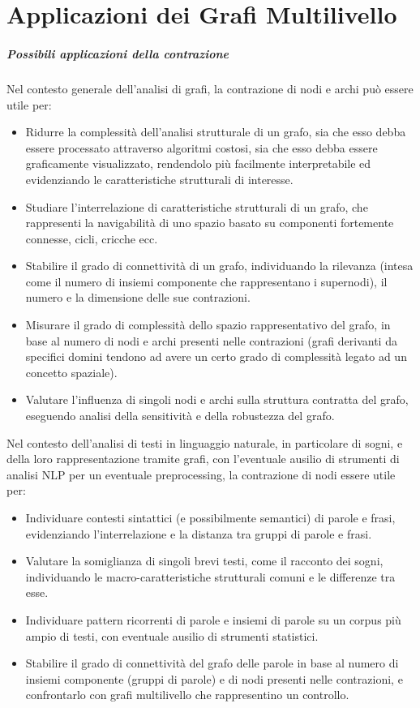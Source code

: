 \chapter{Applicazioni dei Grafi Multilivello}

\paragraph{Possibili applicazioni della contrazione}
Nel contesto generale dell'analisi di grafi, la contrazione di nodi e archi pu\`o essere utile per:
\begin{itemize}
    \item Ridurre la complessit\`a dell'analisi strutturale di un grafo, sia che esso debba essere processato
    attraverso algoritmi costosi, sia che esso debba essere graficamente visualizzato, rendendolo pi\`u facilmente
    interpretabile ed evidenziando le caratteristiche strutturali di interesse.
    \item Studiare l'interrelazione di caratteristiche strutturali di un grafo, che rappresenti la navigabilit\`a
    di uno spazio basato su componenti fortemente connesse, cicli, cricche ecc.
    \item Stabilire il grado di connettivit\`a di un grafo, individuando la rilevanza (intesa come il numero di
    insiemi componente che rappresentano i supernodi), il numero e la dimensione delle sue contrazioni.
    \item Misurare il grado di complessit\`a dello spazio rappresentativo del grafo, in base al numero
    di nodi e archi presenti nelle contrazioni (grafi derivanti da specifici domini tendono ad avere un certo grado
    di complessit\`a legato ad un concetto spaziale).
    \item Valutare l'influenza di singoli nodi e archi sulla struttura contratta del grafo, eseguendo analisi
    della sensitivit\`a e della robustezza del grafo.
\end{itemize}

Nel contesto dell'analisi di testi in linguaggio naturale, in particolare di sogni, e della loro rappresentazione
tramite grafi, con l'eventuale ausilio di strumenti di analisi NLP per un eventuale preprocessing, la contrazione di
nodi essere utile per:
\begin{itemize}
    \item Individuare contesti sintattici (e possibilmente semantici) di parole e frasi, evidenziando l'interrelazione
    e la distanza tra gruppi di parole e frasi.
    \item Valutare la somiglianza di singoli brevi testi, come il racconto dei sogni, individuando le
    macro-caratteristiche strutturali comuni e le differenze tra esse.
    \item Individuare pattern ricorrenti di parole e insiemi di parole su un corpus pi\`u ampio di testi, con
    eventuale ausilio di strumenti statistici.
    \item Stabilire il grado di connettivit\`a del grafo delle parole in base al numero di insiemi componente
    (gruppi di parole) e di nodi presenti nelle contrazioni, e confrontarlo con grafi multilivello che rappresentino
    un controllo.
\end{itemize}
